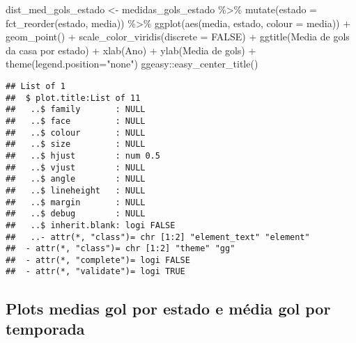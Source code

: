 \documentclass[
]{article}
\newenvironment{Shaded}{\begin{snugshade}}{\end{snugshade}}
\newcommand{\AttributeTok}[1]{\textcolor[rgb]{0.77,0.63,0.00}{#1}}
\newcommand{\ConstantTok}[1]{\textcolor[rgb]{0.00,0.00,0.00}{#1}}
\newcommand{\FunctionTok}[1]{\textcolor[rgb]{0.00,0.00,0.00}{#1}}
\newcommand{\NormalTok}[1]{#1}
\newcommand{\OtherTok}[1]{\textcolor[rgb]{0.56,0.35,0.01}{#1}}
\newcommand{\SpecialCharTok}[1]{\textcolor[rgb]{0.00,0.00,0.00}{#1}}
\newcommand{\StringTok}[1]{\textcolor[rgb]{0.31,0.60,0.02}{#1}}
\begin{document}
\begin{Shaded}
\begin{Highlighting}[]
\NormalTok{dist\_med\_gols\_estado }\OtherTok{\textless{}{-}}\NormalTok{ medidas\_gols\_estado }\SpecialCharTok{\%\textgreater{}\%} \FunctionTok{mutate}\NormalTok{(}\AttributeTok{estado =} \FunctionTok{fct\_reorder}\NormalTok{(estado, media)) }\SpecialCharTok{\%\textgreater{}\%}
  \FunctionTok{ggplot}\NormalTok{(}\FunctionTok{aes}\NormalTok{(media, estado, }\AttributeTok{colour =}\NormalTok{ media)) }\SpecialCharTok{+} \FunctionTok{geom\_point}\NormalTok{() }\SpecialCharTok{+}
  \FunctionTok{scale\_color\_viridis}\NormalTok{(}\AttributeTok{discrete =} \ConstantTok{FALSE}\NormalTok{) }\SpecialCharTok{+}
  \FunctionTok{ggtitle}\NormalTok{(}\StringTok{\textquotesingle{}Media de gols da casa por estado\textquotesingle{}}\NormalTok{) }\SpecialCharTok{+} 
  \FunctionTok{xlab}\NormalTok{(}\StringTok{\textquotesingle{}Ano\textquotesingle{}}\NormalTok{) }\SpecialCharTok{+} \FunctionTok{ylab}\NormalTok{(}\StringTok{\textquotesingle{}Media de gols\textquotesingle{}}\NormalTok{) }\SpecialCharTok{+} 
  \FunctionTok{theme}\NormalTok{(}\AttributeTok{legend.position=}\StringTok{"none"}\NormalTok{)}
\NormalTok{   ggeasy}\SpecialCharTok{::}\FunctionTok{easy\_center\_title}\NormalTok{()}
\end{Highlighting}
\end{Shaded}

\begin{verbatim}
## List of 1
##  $ plot.title:List of 11
##   ..$ family       : NULL
##   ..$ face         : NULL
##   ..$ colour       : NULL
##   ..$ size         : NULL
##   ..$ hjust        : num 0.5
##   ..$ vjust        : NULL
##   ..$ angle        : NULL
##   ..$ lineheight   : NULL
##   ..$ margin       : NULL
##   ..$ debug        : NULL
##   ..$ inherit.blank: logi FALSE
##   ..- attr(*, "class")= chr [1:2] "element_text" "element"
##  - attr(*, "class")= chr [1:2] "theme" "gg"
##  - attr(*, "complete")= logi FALSE
##  - attr(*, "validate")= logi TRUE
\end{verbatim}

\hypertarget{plots-medias-gol-por-estado-e-muxe9dia-gol-por-temporada}{%
\subsection{Plots medias gol por estado e média gol por
temporada}\label{plots-medias-gol-por-estado-e-muxe9dia-gol-por-temporada}}
\end{document}
